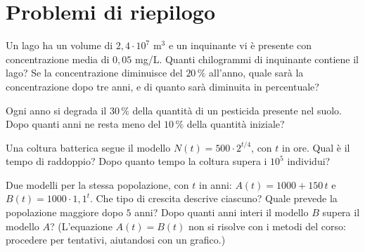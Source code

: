 \section{Problemi di riepilogo}

\begin{esercizio}[\liv{2}]
Un lago ha un volume di $2{,}4\cdot10^{7}$ m$^{3}$ e un inquinante vi \`e presente con concentrazione media di $0{,}05$ mg/L. Quanti chilogrammi di inquinante contiene il lago? Se la concentrazione diminuisce del $20\,\%$ all'anno, quale sar\`a la concentrazione dopo tre anni, e di quanto sar\`a diminuita in percentuale?
\end{esercizio}

\begin{esercizio}[\liv{2}]
Ogni anno si degrada il $30\,\%$ della quantità di un pesticida presente nel suolo. Dopo quanti anni ne resta meno del $10\,\%$ della quantità iniziale?
\end{esercizio}

\begin{esercizio}[\liv{2}]
Una coltura batterica segue il modello $N(t)=500\cdot2^{t/4}$, con $t$ in ore. Qual è il tempo di raddoppio? Dopo quanto tempo la coltura supera i $10^5$ individui?
\end{esercizio}

\begin{esercizio}[\liv{3}]
Due modelli per la stessa popolazione, con $t$ in anni: $A(t)=1000+150\,t$ e $B(t)=1000\cdot1{,}1^t$. Che tipo di crescita descrive ciascuno? Quale prevede la popolazione maggiore dopo $5$ anni? Dopo quanti anni interi il modello $B$ supera il modello $A$? (L'equazione $A(t)=B(t)$ non si risolve con i metodi del corso: procedere per tentativi, aiutandosi con un grafico.)
\end{esercizio}

\stampasoluzioni

